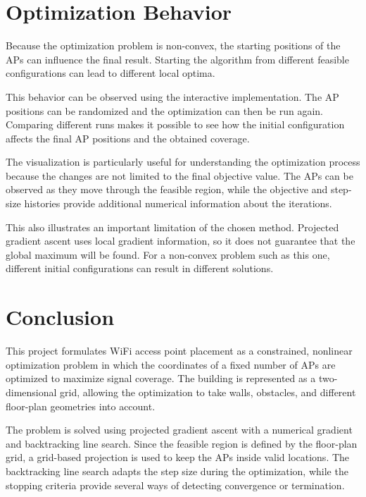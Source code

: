 \documentclass[11pt]{article}
\begin{document}
\section{Optimization Behavior}

Because the optimization problem is non-convex, the starting positions
of the APs can influence the final result. Starting the algorithm from
different feasible configurations can lead to different local optima.

This behavior can be observed using the interactive implementation.
The AP positions can be randomized and the optimization can then be
run again. Comparing different runs makes it possible to see how the
initial configuration affects the final AP positions and the obtained
coverage.

The visualization is particularly useful for understanding the
optimization process because the changes are not limited to the final
objective value. The APs can be observed as they move through the
feasible region, while the objective and step-size histories provide
additional numerical information about the iterations.

This also illustrates an important limitation of the chosen method.
Projected gradient ascent uses local gradient information, so it does
not guarantee that the global maximum will be found. For a non-convex
problem such as this one, different initial configurations can result
in different solutions.

\section{Conclusion}

This project formulates WiFi access point placement as a constrained,
nonlinear optimization problem in which the coordinates of a fixed
number of APs are optimized to maximize signal coverage. The building
is represented as a two-dimensional grid, allowing the optimization to
take walls, obstacles, and different floor-plan geometries into
account.

The problem is solved using projected gradient ascent with a numerical
gradient and backtracking line search. Since the feasible region is
defined by the floor-plan grid, a grid-based projection is used to keep
the APs inside valid locations. The backtracking line search adapts the
step size during the optimization, while the stopping criteria provide
several ways of detecting convergence or termination.
\end{document}
